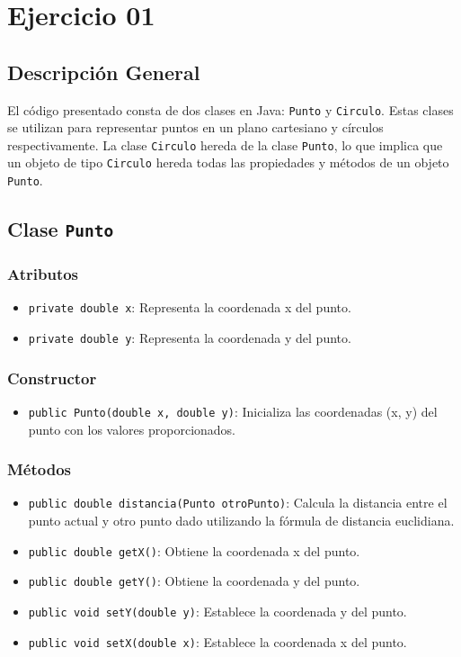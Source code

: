 
\section{Ejercicio 01}

\subsection{Descripción General}
El código presentado consta de dos clases en Java: \texttt{Punto} y \texttt{Circulo}. Estas clases se utilizan para representar puntos en un plano cartesiano y círculos respectivamente. La clase \texttt{Circulo} hereda de la clase \texttt{Punto}, lo que implica que un objeto de tipo \texttt{Circulo} hereda todas las propiedades y métodos de un objeto \texttt{Punto}.

\subsection{Clase \texttt{Punto}}
\subsubsection{Atributos}
\begin{itemize}
    \item \texttt{private double x}: Representa la coordenada x del punto.
    \item \texttt{private double y}: Representa la coordenada y del punto.
\end{itemize}

\subsubsection{Constructor}
\begin{itemize}
    \item \texttt{public Punto(double x, double y)}: Inicializa las coordenadas (x, y) del punto con los valores proporcionados.
\end{itemize}

\subsubsection{Métodos}
\begin{itemize}
    \item \texttt{public double distancia(Punto otroPunto)}: Calcula la distancia entre el punto actual y otro punto dado utilizando la fórmula de distancia euclidiana.
    \item \texttt{public double getX()}: Obtiene la coordenada x del punto.
    \item \texttt{public double getY()}: Obtiene la coordenada y del punto.
    \item \texttt{public void setY(double y)}: Establece la coordenada y del punto.
    \item \texttt{public void setX(double x)}: Establece la coordenada x del punto.
\end{itemize}

